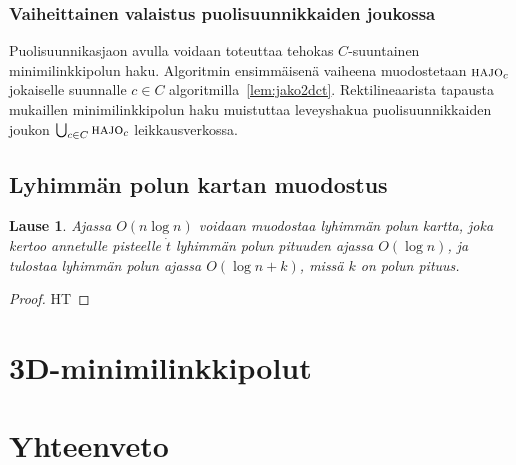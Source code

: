 \documentclass[finnish]{tktltiki2}
\newtheorem{lau}{Lause}
\theoremstyle{definition}
\theoremstyle{remark}
\newcommand\ept{\ensuremath{\dot{t}}\xspace}
\newcommand\decomp[1]{\ensuremath{\textsc{hajo}_{#1}}\xspace}
\begin{document}
\subsubsection{Vaiheittainen valaistus puolisuunnikkaiden joukossa}

Puolisuunnikasjaon avulla voidaan toteuttaa tehokas $C$-suuntainen minimilinkkipolun haku.
Algoritmin ensimmäisenä vaiheena muodostetaan \decomp{c} jokaiselle suunnalle $c\in C$ algoritmilla~\ref{lem:jako2dct}.
Rektilineaarista tapausta mukaillen minimilinkkipolun haku muistuttaa leveyshakua puolisuunnikkaiden joukon $\bigcup_{c\in C}\decomp{c}$ leikkausverkossa.


\subsection{Lyhimmän polun kartan muodostus}

\begin{lau}Ajassa $O(n\log n)$ voidaan muodostaa lyhimmän polun kartta, joka kertoo annetulle pisteelle \ept lyhimmän polun pituuden ajassa $O(\log n)$, ja tulostaa lyhimmän polun ajassa $O(\log n + k)$, missä $k$ on polun pituus.\end{lau}
\begin{proof}HT\end{proof}



\section{3D-minimilinkkipolut}\label{sec:link3d}



\section{Yhteenveto}





\end{document}
